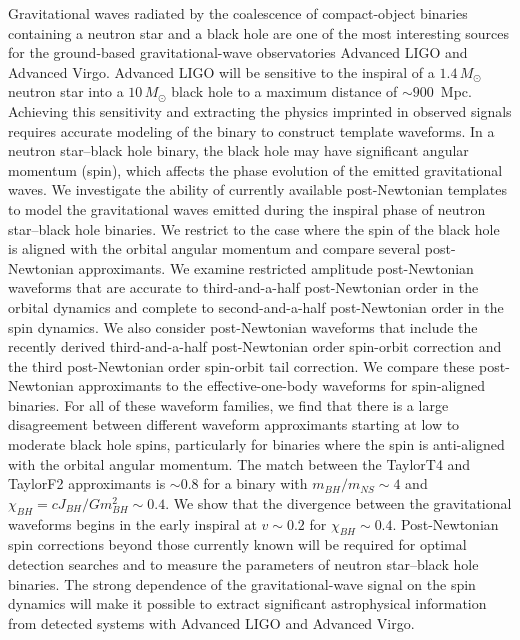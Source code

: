 Gravitational waves radiated by the coalescence of compact-object binaries
containing a neutron star and a black hole are one of the most interesting
sources for the ground-based gravitational-wave observatories Advanced LIGO and
Advanced Virgo. Advanced LIGO will be sensitive to the inspiral of a $1.4\, M_\odot$
neutron star into a $10\,M_\odot$ black hole to a maximum distance of $\sim 900$~Mpc. 
Achieving this sensitivity and extracting the physics imprinted in
observed signals requires accurate modeling of the binary to construct
template waveforms. In a neutron star--black hole binary, the black hole may
have significant angular momentum (spin), which affects the phase evolution of
the emitted gravitational waves. We investigate the ability of currently available
post-Newtonian templates to model the gravitational waves emitted during the
inspiral phase of neutron star--black hole binaries. We restrict to the case where the spin of the
black hole is aligned with the orbital angular momentum and compare several
post-Newtonian approximants. We examine
restricted amplitude post-Newtonian waveforms that are accurate to
third-and-a-half post-Newtonian order in the orbital dynamics and complete to second-and-a-half post-Newtonian order
in the spin dynamics. We also consider post-Newtonian waveforms that include the recently derived third-and-a-half
post-Newtonian order spin-orbit correction and the third post-Newtonian order spin-orbit tail correction. 
We compare these post-Newtonian approximants to the effective-one-body waveforms for spin-aligned binaries.
For all of these waveform families, we find that
 there is a large disagreement between
different waveform approximants starting at low to moderate black hole spins,
particularly for binaries where the spin is anti-aligned with the orbital
angular momentum. The match between the TaylorT4 and TaylorF2 approximants is $\sim 0.8$ for a binary with $m_{BH}/m_{NS} \sim 4$ and 
$\chi_{BH} = cJ_{BH}/Gm^2_{BH} \sim 0.4$.
We show that the divergence between the gravitational waveforms begins in the early
inspiral at $v \sim 0.2$ for $\chi_{BH} \sim 0.4$.  Post-Newtonian spin corrections beyond those currently
known will be required for optimal detection searches and to measure the
parameters of neutron star--black hole binaries. The strong dependence of 
the gravitational-wave signal on the spin dynamics will make it possible to extract significant
astrophysical information from detected systems with Advanced LIGO and
Advanced Virgo.

